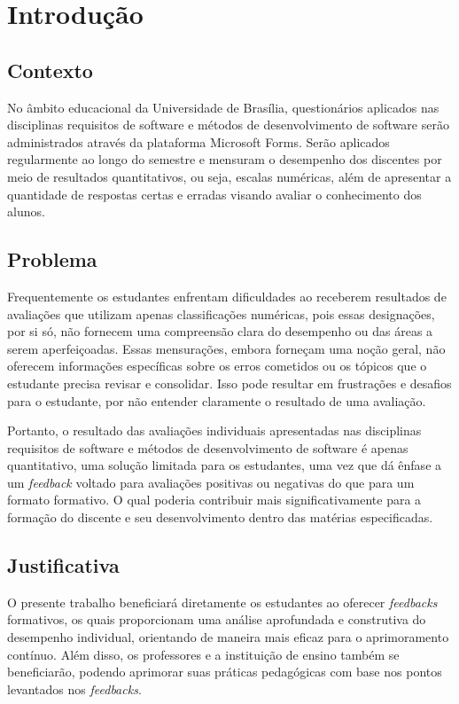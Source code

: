 \chapter[Introdução]{Introdução}

\section{Contexto}

No âmbito educacional da Universidade de Brasília, questionários aplicados nas disciplinas requisitos de software e métodos de desenvolvimento de software serão administrados através da plataforma Microsoft Forms. Serão aplicados regularmente ao longo do semestre e mensuram o desempenho dos discentes por meio de resultados quantitativos, ou seja, escalas numéricas, além de apresentar a quantidade de respostas certas e erradas visando avaliar o conhecimento dos alunos. 

\section{Problema}

Frequentemente os estudantes enfrentam dificuldades ao receberem resultados de avaliações que utilizam apenas classificações numéricas, pois essas designações, por si só, não fornecem uma compreensão clara do desempenho ou das áreas a serem aperfeiçoadas. Essas mensurações, embora forneçam uma noção geral, não oferecem informações específicas sobre os erros cometidos ou os tópicos que o estudante precisa revisar e consolidar. Isso pode resultar em frustrações e desafios para o estudante, por não entender claramente o resultado de uma avaliação. 

Portanto, o resultado das avaliações individuais apresentadas nas disciplinas requisitos de software e métodos de desenvolvimento de software é apenas quantitativo, uma solução limitada para os estudantes, uma vez que dá ênfase a um \textit{feedback} voltado para avaliações positivas ou negativas do que para um formato formativo. O qual poderia contribuir mais significativamente para a formação do discente e seu desenvolvimento dentro das matérias especificadas.

\section{Justificativa}

O presente trabalho beneficiará diretamente os estudantes ao oferecer \textit{feedbacks} formativos, os quais proporcionam uma análise aprofundada e construtiva do desempenho individual, orientando de maneira mais eficaz para o aprimoramento contínuo. Além disso, os professores e a instituição de ensino também se beneficiarão, podendo aprimorar suas práticas pedagógicas com base nos pontos levantados nos \textit{feedbacks}.


